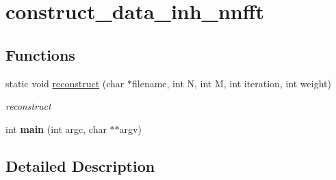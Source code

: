 \hypertarget{group__applications__mri2d__construct__data__inh__nnfft}{\section{construct\-\_\-data\-\_\-inh\-\_\-nnfft}
\label{group__applications__mri2d__construct__data__inh__nnfft}
}
\subsection*{Functions}
\begin{DoxyCompactItemize}
\item 
\hypertarget{group__applications__mri2d__construct__data__inh__nnfft_ga75582a0ebe96f1391e90db0053ee981c}{static void \hyperlink{group__applications__mri2d__construct__data__inh__nnfft_ga75582a0ebe96f1391e90db0053ee981c}{reconstruct} (char $\ast$filename, int N, int M, int iteration, int weight)}\label{group__applications__mri2d__construct__data__inh__nnfft_ga75582a0ebe96f1391e90db0053ee981c}

\begin{DoxyCompactList}\small\item\em reconstruct \end{DoxyCompactList}\item 
\hypertarget{group__applications__mri2d__construct__data__inh__nnfft_ga3c04138a5bfe5d72780bb7e82a18e627}{int {\bfseries main} (int argc, char $\ast$$\ast$argv)}\label{group__applications__mri2d__construct__data__inh__nnfft_ga3c04138a5bfe5d72780bb7e82a18e627}

\end{DoxyCompactItemize}


\subsection{Detailed Description}

